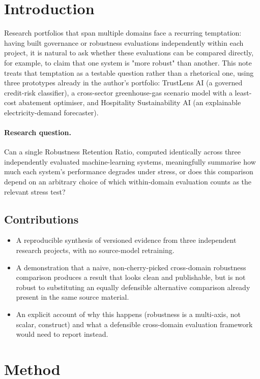 \documentclass[11pt]{article}
\begin{document}
\section{Introduction}

Research portfolios that span multiple domains face a recurring temptation: having built governance or robustness evaluations independently within each project, it is natural to ask whether these evaluations can be compared directly, for example, to claim that one system is "more robust" than another. This note treats that temptation as a testable question rather than a rhetorical one, using three prototypes already in the author's portfolio: TrustLens AI (a governed credit-risk classifier), a cross-sector greenhouse-gas scenario model with a least-cost abatement optimiser, and Hospitality Sustainability AI (an explainable electricity-demand forecaster).

\paragraph{Research question.} Can a single Robustness Retention Ratio, computed identically across three independently evaluated machine-learning systems, meaningfully summarise how much each system's performance degrades under stress, or does this comparison depend on an arbitrary choice of which within-domain evaluation counts as the relevant stress test?

\subsection{Contributions}
\begin{itemize}[leftmargin=*]
    \item A reproducible synthesis of versioned evidence from three independent research projects, with no source-model retraining.
    \item A demonstration that a naive, non-cherry-picked cross-domain robustness comparison produces a result that looks clean and publishable, but is not robust to substituting an equally defensible alternative comparison already present in the same source material.
    \item An explicit account of why this happens (robustness is a multi-axis, not scalar, construct) and what a defensible cross-domain evaluation framework would need to report instead.
\end{itemize}

\section{Method}
\end{document}
